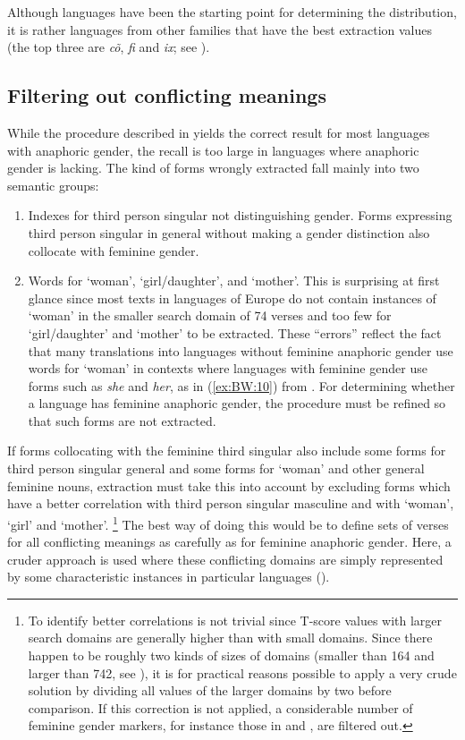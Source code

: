 \documentclass[output=collectionpaper]{langsci/langscibook}
\begin{document}
\largerpage
Although  languages have been the starting point for determining the distribution, it is rather languages from other families that have the best extraction values (the top three are  \textit{cõ},  \textit{fi} and  \textit{ix}; see ).


\subsection{Filtering out conflicting meanings}
\label{sec:BW:3.3}

While the procedure described in  yields the correct result for most languages with anaphoric gender, the recall is too large in languages where anaphoric gender is lacking. The kind of forms wrongly extracted fall mainly into two semantic groups:

\begin{enumerate}[label=(\roman*)]
\item Indexes for third person singular not distinguishing gender. Forms expressing third person singular in general without making a gender distinction also collocate with feminine gender.
\item Words for ‘woman’, ‘girl/daughter’, and ‘mother’. This is surprising at first glance since most texts in  languages of Europe do not contain instances of ‘woman’ in the smaller search domain of 74 verses and too few for ‘girl/daughter’ and ‘mother’ to be extracted. These “errors” reflect the fact that many translations into languages without feminine anaphoric gender use words for ‘woman’ in contexts where languages with feminine gender use forms such as \textit{she} and \textit{her}, as in (\ref{ex:BW:10}) from . For determining whether a language has feminine anaphoric gender, the procedure must be refined so that such forms are not extracted.
\end{enumerate}

If forms collocating with the feminine third singular also include some forms for third person singular general and some forms for ‘woman’ and other general feminine nouns, extraction must take this into account by excluding forms which have a better correlation with third person singular masculine and with ‘woman’, ‘girl’ and ‘mother’.%
\footnote{%
To identify better correlations is not trivial since T-score values with larger search domains are generally higher than with small domains. Since there happen to be roughly two kinds of sizes of domains (smaller than 164 and larger than 742, see ), it is for practical reasons possible to apply a very crude solution by dividing all values of the larger domains by two before comparison. If this correction is not applied, a considerable number of feminine gender markers, for instance those in  and , are filtered out.
} %
The best way of doing this would be to define sets of verses for all conflicting meanings as carefully as for feminine anaphoric gender. Here, a cruder approach is used where these conflicting domains are simply represented by some characteristic instances in particular languages ().
\end{document}
